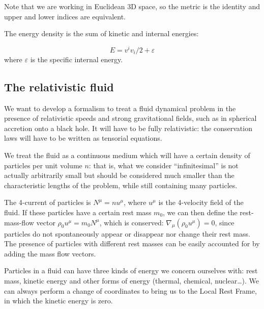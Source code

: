 \documentclass[main.tex]{subfiles}
\begin{document}
Note that we are working in Euclidean 3D space, so the metric is the identity and upper and lower indices are equivalent.

The energy density is the sum of kinetic and internal energies:

\begin{equation}
    E = v^i v_i /2 + \varepsilon
\end{equation}
where $\varepsilon$ is the specific internal energy.

\subsection{The relativistic fluid}



We want to develop a formalism to treat a fluid dynamical problem in the presence of relativistic speeds and strong gravitational fields, such as in spherical accretion onto a black hole. It will have to be fully relativistic: the conservation laws will have to be written as tensorial equations.

We treat the fluid as a continuous medium which will have a certain density of particles per unit volume $n$: that is, what we consider ``infinitesimal'' is not actually arbitrarily small but should be considered much smaller than the characteristic lengths of the problem, while still containing many particles.

The 4-current of particles is $N^\mu = n u^\mu$, where \(u^\mu\) is the 4-velocity field of the fluid.
If these particles have a certain rest mass $m_0$, we can then define the rest-mass-flow vector $\rho_0 u^\mu = m_0 N^\mu$, which is conserved: $\nabla_\mu(\rho_0 u^\mu) = 0$, since particles do not spontaneously appear or disappear nor change their rest mass.
The presence of particles with different rest masses can be easily accounted for by adding the mass flow vectors.

Particles in a fluid can have three kinds of energy we concern ourselves with: rest mass, kinetic energy and other forms of energy (thermal, chemical, nuclear\dots).
We can always perform a change of coordinates to bring us to the Local Rest Frame, in which the kinetic energy is zero.
\end{document}
